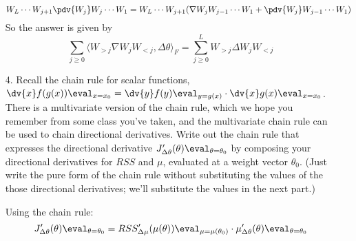 \documentclass{article}
\begin{document}
\begin{itemize}
\begin{answer}
                            \begin{equation*}
                            W_{L} \cdots W_{j + 1} \pdv{W_{j}} W_{j}\cdots W_{1} = W_{L} \cdots W_{j + 1} (\nabla W_{j} W_{j - 1} \cdots W_{1} + \pdv{W_{j}}W_{j - 1} \cdots W_{1})
                            \end{equation*}
                        So the answer is given by
                            \begin{equation*}
                                \sum_{j \geq 0} \langle W_{> j}\nabla W_{j}W_{< j}, \Delta\theta \rangle_{F} = \sum_{j \geq 0}^{L} W_{> j} \Delta W_{j} W_{ < j}
                            \end{equation*}
                    \end{answer}

        \item [4.] Recall the chain rule for scalar functions, $\dv{x} f(g(x)) \eval_{x = x_{0}} = \dv{y}f(y) \eval_{y = g(x)} \cdot \dv{x}g(x) \eval_{x = x_{0}}$. There is a multivariate version of the chain rule, which we hope you remember from some class you've taken, and the multivariate chain rule can be used to chain directional derivatives. Write out the chain rule that expresses the  directional derivative $J^{\prime}_{\Delta\theta}(\theta)\eval_{\theta = \theta_{0}}$ by composing your directional derivatives for $RSS$ and $\mu$, evaluated at a weight vector $\theta_{0}$. (Just write the pure form of the chain rule without substituting the values of the those directional derivatives; we'll substitute the values in the next part.)
            \begin{answer}
                Using the chain rule:
                    \begin{equation*}
                        J^{\prime}_{\Delta\theta}(\theta)\eval_{\theta = \theta_{0}} = RSS^{\prime}_{\Delta\mu}(\mu(\theta)) \eval_{\mu = \mu(\theta_{0})} \cdot \mu^{\prime}_{\Delta\theta}(\theta) \eval_{\theta = \theta_{0}}
                    \end{equation*}
            \end{answer}


\end{itemize}
\end{document}
